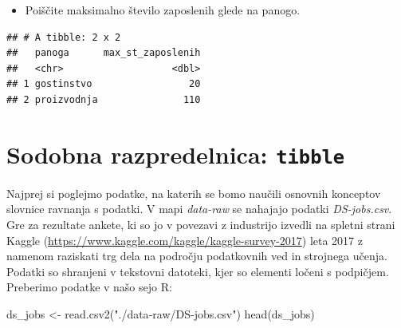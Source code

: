 \documentclass[
]{book}
\newenvironment{Shaded}{\begin{snugshade}}{\end{snugshade}}
\newcommand{\FunctionTok}[1]{\textcolor[rgb]{0.00,0.00,0.00}{#1}}
\newcommand{\NormalTok}[1]{#1}
\newcommand{\OtherTok}[1]{\textcolor[rgb]{0.56,0.35,0.01}{#1}}
\newcommand{\StringTok}[1]{\textcolor[rgb]{0.31,0.60,0.02}{#1}}
\providecommand{\tightlist}{%
  \setlength{\itemsep}{0pt}\setlength{\parskip}{0pt}}
\begin{document}
\begin{itemize}
\tightlist
\item
  Poiščite maksimalno število zaposlenih glede na panogo.
\end{itemize}

\begin{verbatim}
## # A tibble: 2 x 2
##   panoga      max_st_zaposlenih
##   <chr>                   <dbl>
## 1 gostinstvo                 20
## 2 proizvodnja               110
\end{verbatim}

\hypertarget{sodobna-razpredelnica-tibble}{%
\section{\texorpdfstring{Sodobna razpredelnica: \texttt{tibble}}{Sodobna razpredelnica: tibble}}\label{sodobna-razpredelnica-tibble}}

Najprej si poglejmo podatke, na katerih se bomo naučili osnovnih konceptov slovnice ravnanja s podatki. V mapi \emph{data-raw} se nahajajo podatki \emph{DS-jobs.csv}. Gre za rezultate ankete, ki so jo v povezavi z industrijo izvedli na spletni strani Kaggle (\url{https://www.kaggle.com/kaggle/kaggle-survey-2017}) leta 2017 z namenom raziskati trg dela na področju podatkovnih ved in strojnega učenja. Podatki so shranjeni v tekstovni datoteki, kjer so elementi ločeni s podpičjem. Preberimo podatke v našo sejo R:

\begin{Shaded}
\begin{Highlighting}[]
\NormalTok{ds\_jobs }\OtherTok{\textless{}{-}} \FunctionTok{read.csv2}\NormalTok{(}\StringTok{"./data{-}raw/DS{-}jobs.csv"}\NormalTok{)}
\FunctionTok{head}\NormalTok{(ds\_jobs)}
\end{Highlighting}
\end{Shaded}
\end{document}
